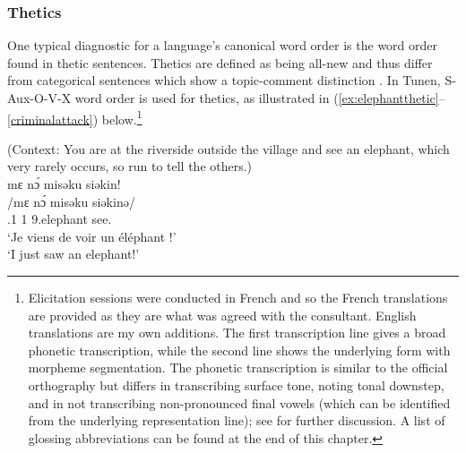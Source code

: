 \documentclass[output=paper,colorlinks,citecolor=brown
]{langscibook}
\begin{document}
\subsubsection{Thetics}
One typical diagnostic for a language's canonical word order is the word order found in thetic sentences. Thetics are defined as being all-new and thus differ from categorical sentences which show a topic\hyp comment distinction \parencite{Sasse1987, Sasse1996, Lambrecht1994, chapters/intro}. In Tunen, S-Aux-O-V-X word order is used for thetics, as illustrated in (\ref{ex:elephantthetic}--\ref{criminalattack}) below.\footnote{Elicitation sessions were conducted in French and so the French translations are provided as they are what was agreed with the consultant. English translations are my own additions. The first transcription line gives a broad phonetic transcription, while the second line shows the underlying form with morpheme segmentation. The phonetic transcription is similar to the official orthography \citep{SatreEtAl2008} but differs in transcribing surface tone, noting tonal downstep, and in not transcribing non-pronounced final vowels (which can be identified from the underlying representation line); see \citet[Chapter 4]{KerrFut} for further discussion. A list of glossing abbreviations can be found at the end of this chapter.}
\largerpage[2]

\ea
\label{ex:elephantthetic}
(Context: You are at the riverside outside the village and see an elephant, which very rarely occurs, so run to tell the others.) \\
\glll
{\db}mɛ nɔ́	misəku	siəkin! \\
/mɛ nɔ́	misəku	siəkinə/ \\
{\db}\SM{}.1\SG{} \PST{}1{}	9.elephant	see.\DUR{} \\
\glt
`Je viens de voir un éléphant !'\\  `I just saw an elephant!' \jambox*{[PM 316] }

 \z
\end{document}
